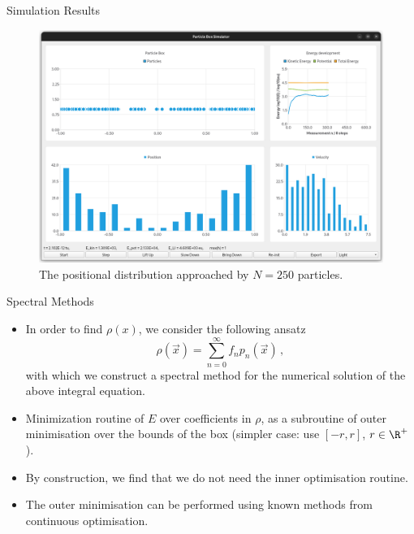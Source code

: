\documentclass[aspectratio=169, hyperref={colorlinks=true}]{beamer}
\begin{document}
  \begin{frame}{Simulation Results}
    \begin{figure}
      \centering
      \includegraphics[width=0.64\linewidth]{figures/screenshot5.png}
      \caption{The positional distribution approached by $N = 250$ particles.}
    \end{figure}
  \end{frame}

  \begin{frame}{Spectral Methods}
    \begin{itemize}
      \item In order to find $\rho(x)$, we consider the following ansatz
            $$\rho(\vec{x}) = \sum_{n=0}^{\infty} f_n p_n(\vec{x})\,,$$
            with which we construct a spectral method for the numerical solution of the above integral equation.
      \item Minimization routine of $E$ over coefficients in $\rho$, as a subroutine of outer minimisation over the bounds of the box (simpler case: use $[-r, r]$, $r \in \R^+$).
      \item By construction, we find that we do not need the inner optimisation routine.
      \item The outer minimisation can be performed using known methods from continuous optimisation.
    \end{itemize}
  \end{frame}
\end{document}
